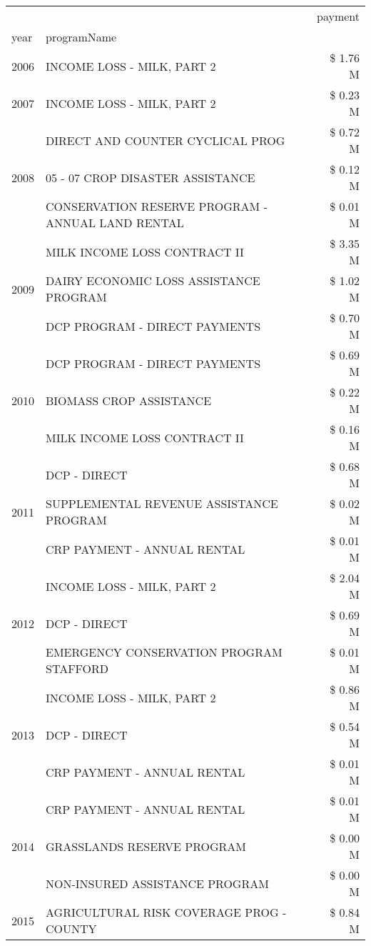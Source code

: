 \begin{tabular}{llr}
\toprule
 &  & payment \\
year & programName &  \\
\midrule
2006 & INCOME LOSS - MILK, PART 2 & \$ 1.76 M \\
\cline{1-3}
2007 & INCOME LOSS - MILK, PART 2 & \$ 0.23 M \\
\cline{1-3}
\multirow[t]{3}{*}{2008} & DIRECT AND COUNTER CYCLICAL PROG & \$ 0.72 M \\
 & 05 - 07 CROP DISASTER ASSISTANCE & \$ 0.12 M \\
 & CONSERVATION RESERVE PROGRAM - ANNUAL LAND RENTAL & \$ 0.01 M \\
\cline{1-3}
\multirow[t]{3}{*}{2009} & MILK INCOME LOSS CONTRACT II & \$ 3.35 M \\
 & DAIRY ECONOMIC LOSS ASSISTANCE PROGRAM & \$ 1.02 M \\
 & DCP PROGRAM - DIRECT PAYMENTS & \$ 0.70 M \\
\cline{1-3}
\multirow[t]{3}{*}{2010} & DCP PROGRAM - DIRECT PAYMENTS & \$ 0.69 M \\
 & BIOMASS CROP ASSISTANCE & \$ 0.22 M \\
 & MILK INCOME LOSS CONTRACT II & \$ 0.16 M \\
\cline{1-3}
\multirow[t]{3}{*}{2011} & DCP - DIRECT & \$ 0.68 M \\
 & SUPPLEMENTAL REVENUE ASSISTANCE PROGRAM & \$ 0.02 M \\
 & CRP PAYMENT - ANNUAL RENTAL & \$ 0.01 M \\
\cline{1-3}
\multirow[t]{3}{*}{2012} & INCOME LOSS - MILK, PART 2 & \$ 2.04 M \\
 & DCP - DIRECT & \$ 0.69 M \\
 & EMERGENCY CONSERVATION PROGRAM STAFFORD & \$ 0.01 M \\
\cline{1-3}
\multirow[t]{3}{*}{2013} & INCOME LOSS - MILK, PART 2 & \$ 0.86 M \\
 & DCP - DIRECT & \$ 0.54 M \\
 & CRP PAYMENT - ANNUAL RENTAL & \$ 0.01 M \\
\cline{1-3}
\multirow[t]{3}{*}{2014} & CRP PAYMENT - ANNUAL RENTAL & \$ 0.01 M \\
 & GRASSLANDS RESERVE PROGRAM & \$ 0.00 M \\
 & NON-INSURED ASSISTANCE PROGRAM & \$ 0.00 M \\
\cline{1-3}
\multirow[t]{3}{*}{2015} & AGRICULTURAL RISK COVERAGE PROG - COUNTY & \$ 0.84 M \\

\end{tabular}
